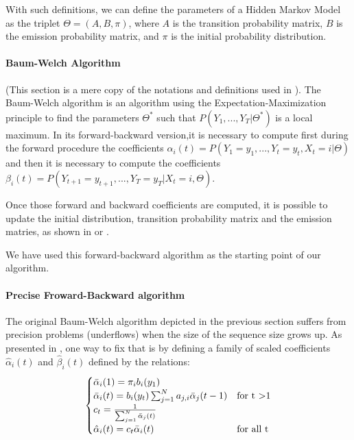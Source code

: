 With such definitions, we can define the parameters of a Hidden Markov Model as the triplet $\Theta = (A, B, \pi)$, where $A$ is the transition probability matrix, $B$ is the emission probability matrix, and $\pi$ is the initial probability distribution.
\paragraph{Baum-Welch Algorithm}
(This section is a mere copy of the notations and definitions used in \cite{wiki:BaumWelch_algorithm}).
The Baum-Welch algorithm is an algorithm using the Expectation-Maximization principle to find the parameters $\Theta^*$ such that $P(Y_1,...,Y_T| \Theta^* )$ is a local maximum.
In its forward-backward version,it is necessary to compute first during the forward procedure the coefficients $\alpha_i(t) = P(Y_1=y_1,...,Y_t = y_t, X_t = i | \Theta )$ and then it is necessary to compute the coefficients $\beta_i(t) = P(Y_{t+1}=y_{t+1},...,Y_T = y_T| X_t = i, \Theta )$.

Once those forward and backward coefficients are computed, it is possible to update the initial distribution, transition probability matrix and the emission matries, as shown in \cite{rabiner1989tutorial} or \cite{wiki:BaumWelch_algorithm}.

We have used this forward-backward algorithm as the starting point of our algorithm.
\paragraph{Precise Froward-Backward algorithm}
The original Baum-Welch algorithm depicted in the previous section suffers from precision problems (underflows) when the size of the sequence size grows up.
As presented in \cite{rabiner1989tutorial}, one way to fix that is by defining a family of scaled coefficients $\hat{\alpha}_i(t)$ and $\hat{\beta}_i(t)$ defined by the relations:
\begin{equation}
\begin{cases}
\bar{\alpha}_i(1) = \pi_i b_i(y_1) & \\
\bar{\alpha}_i(t) = b_i(y_t)\sum_{j=1}^{N}{a_{j,i}\bar{\alpha}_j(t-1)} & \text{for t \textgreater 1} \\
c_t = \frac{1}{\sum^N_{j=1} \bar{\alpha}_j(t)} & \\
\hat{\alpha}_i(t) = c_t \bar{\alpha}_i(t) & \text{for all t}
\end{cases}
\end{equation}

